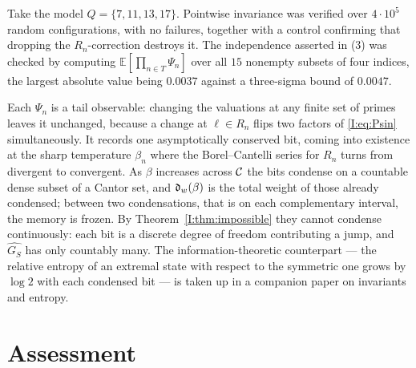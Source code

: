 \begin{remark}\label{I:rem:numpsi}
Take the model $Q=\{7,11,13,17\}$. Pointwise invariance was verified over
$4\cdot10^{5}$ random configurations, with no failures, together with a control
confirming that dropping the $R_n$-correction destroys it. The independence
asserted in (3) was checked by computing
$\mathbb E[\prod_{n\in T}\Psi_n]$ over all $15$ nonempty subsets of four indices, the largest
absolute value being $0.0037$ against a three-sigma bound of $0.0047$.
\end{remark}

\begin{remark}\label{I:rem:memory}
Each $\Psi_n$ is a tail observable: changing the valuations at any finite set of primes
leaves it unchanged, because a change at $\ell\in R_n$ flips two factors of \eqref{I:eq:Psin}
simultaneously. It records one asymptotically conserved bit, coming into existence at the
sharp temperature $\beta_n$ where the Borel--Cantelli series for $R_n$ turns from divergent
to convergent. As $\beta$ increases across $\mathcal{C}$ the bits condense on a countable dense
subset of a Cantor set, and $\mathfrak{d}_w(\beta)$ is the total weight of those already condensed;
between two condensations, that is on each complementary interval, the memory is frozen. By
Theorem~\ref{I:thm:impossible} they cannot condense continuously: each bit is a discrete
degree of freedom contributing a jump, and $\widehat{G_S}$ has only countably many. The
information-theoretic counterpart --- the relative entropy of an extremal state with respect
to the symmetric one grows by $\log2$ with each condensed bit --- is taken up in a companion
paper on invariants and entropy.
\end{remark}

\section{Assessment}

